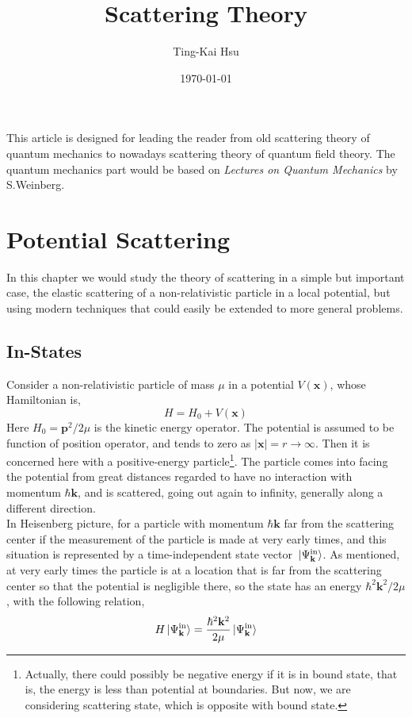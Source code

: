 \documentclass[12pt]{article}
\title{Scattering Theory}
\author{Ting-Kai Hsu}
\date{\today}
\numberwithin{equation}{section}
\begin{document}
\maketitle
\tableofcontents
This article is designed for leading the reader from old scattering theory of quantum mechanics to nowadays scattering theory of quantum field theory.
The quantum mechanics part would be based on \textit{Lectures on Quantum Mechanics} by S.Weinberg.
\section{Potential Scattering}
In this chapter we would study the theory of scattering in a simple but important case, the elastic scattering of a non-relativistic particle in a local potential, but using modern techniques that could easily be extended to more general problems.
\subsection{In-States}
Consider a non-relativistic particle of mass $\mu$ in a potential $V(\mathbf{x})$, whose Hamiltonian is,
\begin{equation}
    H = H_0 + V(\mathbf{x})
\end{equation}
Here $H_0 = \mathbf{p}^2/2\mu$ is the kinetic energy operator. 
The potential is assumed to be function of position operator, and tends to zero as $|\mathbf{x}| = r\rightarrow\infty$.
Then it is concerned here with a positive-energy particle\footnote{Actually, there could possibly be negative energy if it is in bound state, that is, the energy is less than potential at boundaries. But now, we are considering scattering state, which is opposite with bound state.}.
The particle comes into facing the potential from great distances regarded to have no interaction with momentum $\hbar\mathbf{k}$, and is scattered, going out again to infinity, generally along a different direction.
\\\indent In Heisenberg picture, for a particle with momentum $\hbar\mathbf{k}$ far from the scattering center if the measurement of the particle is made at very early times, and this situation is represented by a time-independent state vector $\ket*{\Psi^{\text{in}}_{\mathbf{k}}}$.
As mentioned, at very early times the particle is at a location that is far from the scattering center so that the potential is negligible there, so the state has an energy $\hbar^2\mathbf{k}^2/2\mu$, with the following relation,
\begin{equation}
    H\ket*{\Psi_{\mathbf{k}}^{\text{in}}} = \frac{\hbar^2\mathbf{k}^2}{2\mu}\ket*{\Psi_{\mathbf{k}}^{\text{in}}}
\end{equation}
\end{document}
